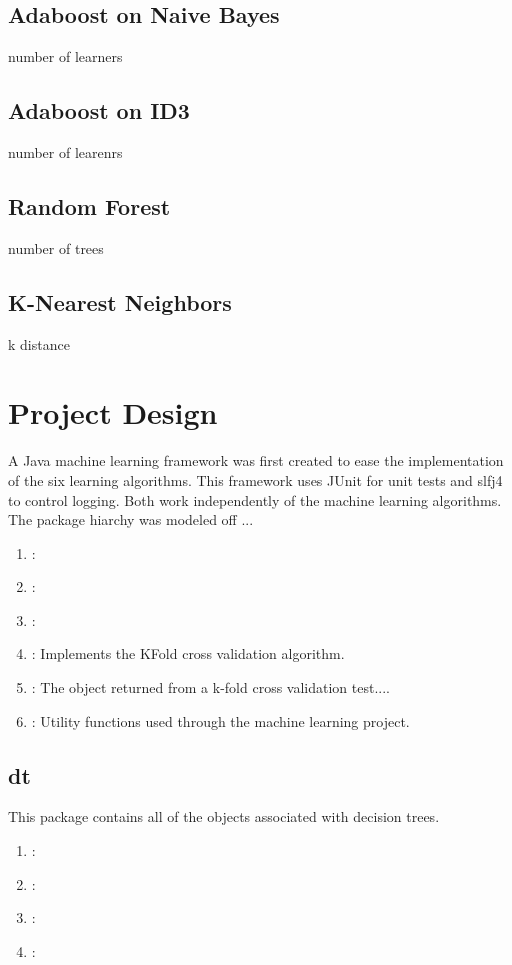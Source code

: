 \documentclass[11pt]{article}
\begin{document}
\subsection{Adaboost on Naive Bayes}
number of learners

\subsection{Adaboost on ID3}
number of learenrs

\subsection{Random Forest}
number of trees

\subsection{K-Nearest Neighbors}
k
distance

\section{Project Design}
A Java machine learning framework was first created to ease the implementation of the six learning algorithms. This framework uses JUnit for unit tests and slfj4 to control logging. Both work independently of the machine learning algorithms. The package hiarchy was modeled off ...

\begin{enumerate}
  \item {}:
  \item {}:
  \item {}:
  \item {}: Implements the KFold cross validation algorithm.
  \item {}: The object returned from a k-fold cross validation test....
  \item {}: Utility functions used through the machine learning project.
\end{enumerate}

\subsection{dt}
This package contains all of the objects associated with decision trees.

\begin{enumerate}
  \item {}:
  \item {}:
  \item {}:
  \item {}:
\end{enumerate}
\end{document}
